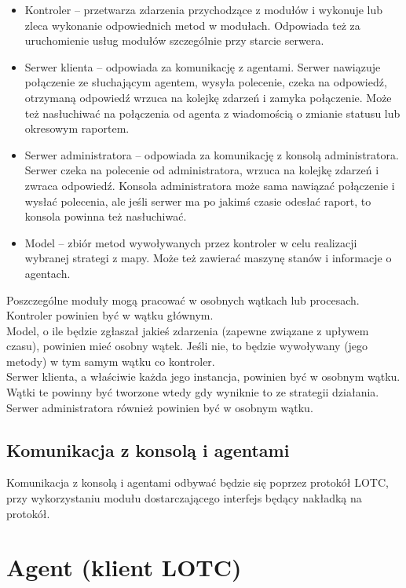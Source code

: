 \documentclass[10pt,a4paper]{article}
\begin{document}
			\begin{itemize}   
				\item Kontroler – przetwarza zdarzenia przychodzące z modułów i wykonuje lub zleca wykonanie odpowiednich metod w modułach. Odpowiada też za uruchomienie usług modułów szczególnie przy starcie serwera.
				\item Serwer klienta – odpowiada za komunikację z agentami. Serwer nawiązuje połączenie ze słuchającym agentem, wysyła polecenie, czeka na odpowiedź, otrzymaną odpowiedź wrzuca na kolejkę zdarzeń i zamyka połączenie. Może też nasłuchiwać na połączenia od agenta z wiadomością o zmianie statusu lub okresowym raportem.
				\item Serwer administratora – odpowiada za komunikację z konsolą administratora. Serwer czeka na polecenie od administratora, wrzuca na kolejkę zdarzeń i zwraca odpowiedź. Konsola administratora może sama nawiązać połączenie i wysłać polecenia, ale jeśli serwer ma po jakimś czasie odesłać raport, to konsola powinna też nasłuchiwać.
				\item Model – zbiór metod wywoływanych przez kontroler w celu realizacji wybranej strategi z mapy. Może też zawierać maszynę stanów i informacje o agentach.
			\end{itemize}
			Poszczególne moduły mogą pracować w osobnych wątkach lub procesach. Kontroler powinien być w wątku głównym. \\
			Model, o ile będzie zgłaszał jakieś zdarzenia (zapewne związane z upływem czasu), powinien mieć osobny wątek. Jeśli nie, to będzie wywoływany (jego metody) w tym samym wątku co kontroler. \\
			Serwer klienta, a właściwie każda jego instancja, powinien być w osobnym wątku. Wątki te powinny być tworzone wtedy gdy wyniknie to ze strategii działania. \\
			Serwer administratora również powinien być w osobnym wątku. \\
		
		\subsection{Komunikacja z konsolą i agentami}
			Komunikacja z konsolą i agentami odbywać będzie się poprzez protokół LOTC, przy wykorzystaniu modułu dostarczającego interfejs będący nakładką na protokół. \\
			
    
    \section{Agent (klient LOTC)}
\end{document}
